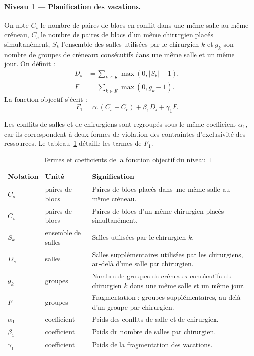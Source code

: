 \documentclass[11pt,a4paper]{article}
\begin{document}
\paragraph{Niveau 1 --- Planification des vacations.}
On note $C_s$ le nombre de paires de blocs en conflit dans une même salle au même créneau, $C_c$ le nombre de paires de blocs d'un même chirurgien placés simultanément, $S_k$ l'ensemble des salles utilisées par le chirurgien $k$ et $g_k$ son nombre de groupes de créneaux consécutifs dans une même salle et un même jour. On définit :
\begin{align}
D_s&=\sum_{k\in K}\max(0,|S_k|-1),\\
F&=\sum_{k\in K}\max(0,g_k-1).
\end{align}
La fonction objectif s'écrit :
\begin{equation}
\boxed{F_1=\alpha_1(C_s+C_c)+\beta_1D_s+\gamma_1F.}
\label{eq:F1}
\end{equation}

Les conflits de salles et de chirurgiens sont
regroupés sous le même coefficient $\alpha_1$,
car ils correspondent à deux formes de violation
des contraintes d'exclusivité des ressources. Le tableau~\ref{tab:termes_n1} détaille les termes de $F_1$.

\begin{table}[htbp]
\centering\footnotesize
\caption{Termes et coefficients de la fonction objectif du niveau 1}
\label{tab:termes_n1}
\begin{tabularx}{\linewidth}{@{}p{1.6cm}p{2.8cm}X@{}}
\toprule
\textbf{Notation} & \textbf{Unité} & \textbf{Signification} \\
\midrule
$C_s$ & paires de blocs & Paires de blocs placés dans une même salle au même créneau. \\
$C_c$ & paires de blocs & Paires de blocs d'un même chirurgien placés simultanément. \\
$S_k$ & ensemble de salles & Salles utilisées par le chirurgien $k$. \\
$D_s$ & salles & Salles supplémentaires utilisées par les chirurgiens, au-delà d'une salle par chirurgien. \\
$g_k$ & groupes & Nombre de groupes de créneaux consécutifs du chirurgien $k$ dans une même salle et un même jour. \\
$F$ & groupes & Fragmentation : groupes supplémentaires, au-delà d'un groupe par chirurgien. \\
$\alpha_1$ & coefficient & Poids des conflits de salle et de chirurgien. \\
$\beta_1$ & coefficient & Poids du nombre de salles par chirurgien. \\
$\gamma_1$ & coefficient & Poids de la fragmentation des vacations. \\
\bottomrule
\end{tabularx}
\end{table}
\end{document}
